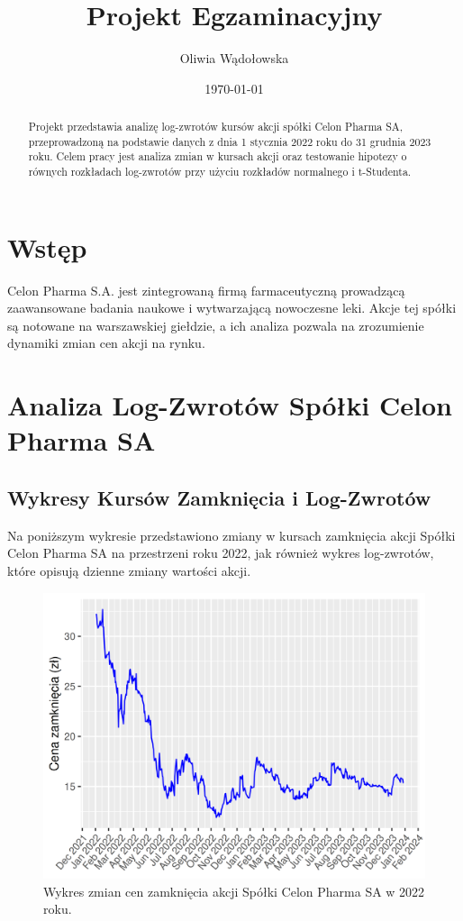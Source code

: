 \documentclass[a4paper,12pt]{article}
\title{Projekt Egzaminacyjny}
\author{Oliwia Wądołowska}
\date{\today}
\begin{document}
\maketitle

\begin{abstract}
Projekt przedstawia analizę log-zwrotów kursów akcji spółki Celon Pharma SA, przeprowadzoną na podstawie danych z dnia 1 stycznia 2022 roku do 31 grudnia 2023 roku. Celem pracy jest analiza zmian w kursach akcji oraz testowanie hipotezy o równych rozkładach log-zwrotów przy użyciu rozkładów normalnego i t-Studenta.
\end{abstract}

\tableofcontents
\newpage

\section{Wstęp}
Celon Pharma S.A. jest zintegrowaną firmą farmaceutyczną prowadzącą zaawansowane badania naukowe i wytwarzającą nowoczesne leki. Akcje tej spółki są notowane na warszawskiej giełdzie, a ich analiza pozwala na zrozumienie dynamiki zmian cen akcji na rynku.

\section{Analiza Log-Zwrotów Spółki Celon Pharma SA}
\subsection{Wykresy Kursów Zamknięcia i Log-Zwrotów}
Na poniższym wykresie przedstawiono zmiany w kursach zamknięcia akcji Spółki Celon Pharma SA na przestrzeni roku 2022, jak również wykres log-zwrotów, które opisują dzienne zmiany wartości akcji.

\begin{figure}[h!]
\centering
\includegraphics[width=\textwidth]{img/Wykres_cen_akcji_cln.png}
\caption{Wykres zmian cen zamknięcia akcji Spółki Celon Pharma SA w 2022 roku.}
\end{figure}
\end{document}

